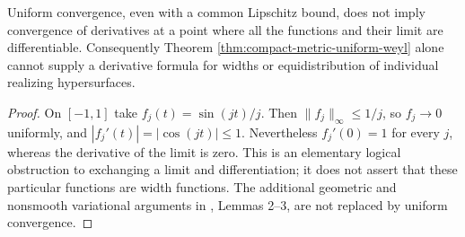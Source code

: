 \begin{example}\label{ex:uniform-limit-derivatives}
Uniform convergence, even with a common Lipschitz bound, does not imply convergence of derivatives at a point where all the functions and their limit are differentiable. Consequently Theorem \ref{thm:compact-metric-uniform-weyl} alone cannot supply a derivative formula for widths or equidistribution of individual realizing hypersurfaces.
\end{example}
\begin{proof}
On $[-1,1]$ take $f_j(t)=\sin(jt)/j$. Then $\|f_j\|_\infty\leq1/j$, so $f_j\to0$ uniformly, and $|f_j'(t)|=|\cos(jt)|\leq1$. Nevertheless $f_j'(0)=1$ for every $j$, whereas the derivative of the limit is zero. This is an elementary logical obstruction to exchanging a limit and differentiation; it does not assert that these particular functions are width functions. The additional geometric and nonsmooth variational arguments in \cite{MNS19}, Lemmas 2--3, are not replaced by uniform convergence.
\end{proof}
